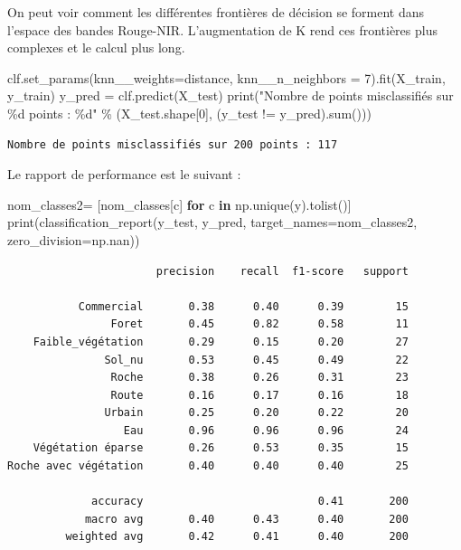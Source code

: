 \documentclass[
  french,
  11pt,
  letterpaper,
  open=any,
  twoside=false,
  french]{scrbook}
\newenvironment{Shaded}{\begin{snugshade}}{\end{snugshade}}
\newcommand{\BuiltInTok}[1]{\textcolor[rgb]{0.00,0.23,0.31}{#1}}
\newcommand{\ControlFlowTok}[1]{\textcolor[rgb]{0.00,0.23,0.31}{\textbf{#1}}}
\newcommand{\DecValTok}[1]{\textcolor[rgb]{0.68,0.00,0.00}{#1}}
\newcommand{\KeywordTok}[1]{\textcolor[rgb]{0.00,0.23,0.31}{\textbf{#1}}}
\newcommand{\NormalTok}[1]{\textcolor[rgb]{0.00,0.23,0.31}{#1}}
\newcommand{\OperatorTok}[1]{\textcolor[rgb]{0.37,0.37,0.37}{#1}}
\newcommand{\SpecialCharTok}[1]{\textcolor[rgb]{0.37,0.37,0.37}{#1}}
\newcommand{\StringTok}[1]{\textcolor[rgb]{0.13,0.47,0.30}{#1}}
\begin{document}
On peut voir comment les différentes frontières de décision se forment
dans l'espace des bandes Rouge-NIR. L'augmentation de K rend ces
frontières plus complexes et le calcul plus long.

\begin{Shaded}
\begin{Highlighting}[]
\NormalTok{clf.set\_params(knn\_\_weights}\OperatorTok{=}\StringTok{\textquotesingle{}distance\textquotesingle{}}\NormalTok{, knn\_\_n\_neighbors }\OperatorTok{=} \DecValTok{7}\NormalTok{).fit(X\_train, y\_train)}
\NormalTok{y\_pred }\OperatorTok{=}\NormalTok{ clf.predict(X\_test)}
\BuiltInTok{print}\NormalTok{(}\StringTok{"Nombre de points misclassifiés sur }\SpecialCharTok{\%d}\StringTok{ points : }\SpecialCharTok{\%d}\StringTok{"}
  \OperatorTok{\%}\NormalTok{ (X\_test.shape[}\DecValTok{0}\NormalTok{], (y\_test }\OperatorTok{!=}\NormalTok{ y\_pred).}\BuiltInTok{sum}\NormalTok{()))}
\end{Highlighting}
\end{Shaded}

\begin{verbatim}
Nombre de points misclassifiés sur 200 points : 117
\end{verbatim}

Le rapport de performance est le suivant :

\begin{Shaded}
\begin{Highlighting}[]
\NormalTok{nom\_classes2}\OperatorTok{=}\NormalTok{ [nom\_classes[c] }\ControlFlowTok{for}\NormalTok{ c }\KeywordTok{in}\NormalTok{ np.unique(y).tolist()]}
\BuiltInTok{print}\NormalTok{(classification\_report(y\_test, y\_pred, target\_names}\OperatorTok{=}\NormalTok{nom\_classes2, zero\_division}\OperatorTok{=}\NormalTok{np.nan))}
\end{Highlighting}
\end{Shaded}

\begin{verbatim}
                       precision    recall  f1-score   support

           Commercial       0.38      0.40      0.39        15
                Foret       0.45      0.82      0.58        11
    Faible_végétation       0.29      0.15      0.20        27
               Sol_nu       0.53      0.45      0.49        22
                Roche       0.38      0.26      0.31        23
                Route       0.16      0.17      0.16        18
               Urbain       0.25      0.20      0.22        20
                  Eau       0.96      0.96      0.96        24
    Végétation éparse       0.26      0.53      0.35        15
Roche avec végétation       0.40      0.40      0.40        25

             accuracy                           0.41       200
            macro avg       0.40      0.43      0.40       200
         weighted avg       0.42      0.41      0.40       200
\end{verbatim}
\end{document}
